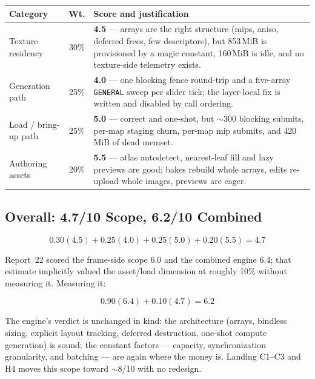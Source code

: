 \documentclass[11pt,a4paper]{article}
\begin{document}
\begin{table}[h]
\centering
\small
\begin{tabular}{@{}lcp{7.2cm}@{}}
\toprule
\textbf{Category} & \textbf{Wt.} & \textbf{Score and justification} \\
\midrule
Texture residency & 30\% & \textbf{4.5} --- arrays are the right structure
(mips, aniso, deferred frees, few descriptors), but 853\,MiB is provisioned by
a magic constant, 160\,MiB is idle, and no texture-side telemetry exists. \\
Generation path & 25\% & \textbf{4.0} --- one blocking fence round-trip and a
five-array \texttt{GENERAL} sweep per slider tick; the layer-local fix is
written and disabled by call ordering. \\
Load / bring-up path & 25\% & \textbf{5.0} --- correct and one-shot, but
$\sim$300 blocking submits, per-map staging churn, per-map mip submits, and
420\,MiB of dead memset. \\
Authoring assets & 20\% & \textbf{5.5} --- atlas autodetect, nearest-leaf fill
and lazy previews are good; bakes rebuild whole arrays, edits re-upload whole
images, previews are eager. \\
\bottomrule
\end{tabular}
\end{table}

\subsection{Overall: 4.7/10 Scope, 6.2/10 Combined}

\begin{equation}
0.30(4.5) + 0.25(4.0) + 0.25(5.0) + 0.20(5.5) = \mathbf{4.7}
\end{equation}

Report~22 scored the frame-side scope 6.0 and the combined engine 6.4; that
estimate implicitly valued the asset/load dimension at roughly 10\% without
measuring it. Measuring it:

\begin{equation}
0.90(6.4) + 0.10(4.7) = \mathbf{6.2}
\end{equation}

The engine's verdict is unchanged in kind: the architecture (arrays, bindless
sizing, explicit layout tracking, deferred destruction, one-shot compute
generation) is sound; the constant factors --- capacity, synchronization
granularity, and batching --- are again where the money is. Landing C1--C3 and
H4 moves this scope toward $\sim$8/10 with no redesign.
\end{document}
